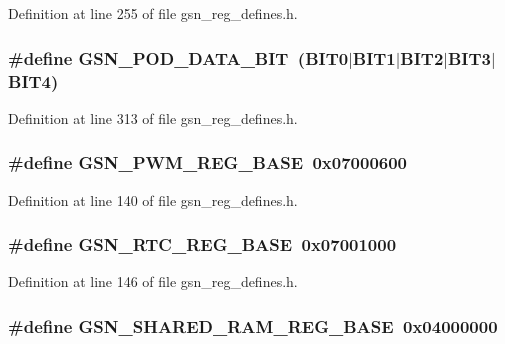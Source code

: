 Definition at line 255 of file gsn\_\-reg\_\-defines.h.

\hypertarget{a00546_ae7b26dd2ab238ec9f247824653e9ce63}{
\subsubsection[{GSN\_\-POD\_\-DATA\_\-BIT}]{\setlength{\rightskip}{0pt plus 5cm}\#define GSN\_\-POD\_\-DATA\_\-BIT~(BIT0$|$BIT1$|$BIT2$|$BIT3$|$BIT4)}}
\label{a00546_ae7b26dd2ab238ec9f247824653e9ce63}


Definition at line 313 of file gsn\_\-reg\_\-defines.h.

\hypertarget{a00546_a08f787e4b0edaa847ceee7c286cf27e3}{
\subsubsection[{GSN\_\-PWM\_\-REG\_\-BASE}]{\setlength{\rightskip}{0pt plus 5cm}\#define GSN\_\-PWM\_\-REG\_\-BASE~0x07000600}}
\label{a00546_a08f787e4b0edaa847ceee7c286cf27e3}


Definition at line 140 of file gsn\_\-reg\_\-defines.h.

\hypertarget{a00546_ac1f9d101177eec7c996d6fb3a8c174d6}{
\subsubsection[{GSN\_\-RTC\_\-REG\_\-BASE}]{\setlength{\rightskip}{0pt plus 5cm}\#define GSN\_\-RTC\_\-REG\_\-BASE~0x07001000}}
\label{a00546_ac1f9d101177eec7c996d6fb3a8c174d6}


Definition at line 146 of file gsn\_\-reg\_\-defines.h.

\hypertarget{a00546_a0b8b89d6ae1608f121741f46bd36c3b4}{
\subsubsection[{GSN\_\-SHARED\_\-RAM\_\-REG\_\-BASE}]{\setlength{\rightskip}{0pt plus 5cm}\#define GSN\_\-SHARED\_\-RAM\_\-REG\_\-BASE~0x04000000}}
\label{a00546_a0b8b89d6ae1608f121741f46bd36c3b4}


